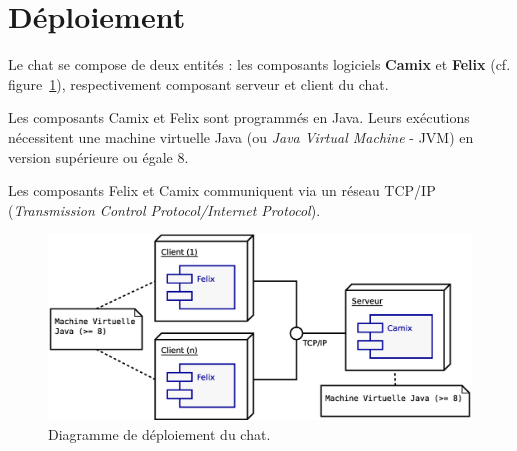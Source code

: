 %

\section{Déploiement}
\label{sec:deploiement}

Le chat se compose de deux entités : les composants logiciels \textbf{Camix} et \textbf{Felix} (cf. figure~\ref{sec:deploiement:figchat}), respectivement composant serveur et client du chat.

\smallskip
Les composants Camix et Felix sont programmés en Java. Leurs exécutions nécessitent une machine virtuelle Java (ou \textit{Java Virtual Machine} - JVM) en version supérieure ou égale 8.

\smallskip
Les composants Felix et Camix communiquent via un réseau TCP/IP (\textit{Transmission Control Protocol/Internet Protocol}).

\medskip
\begin{figure}[h!]
\begin{center}
\includegraphics[width=\linewidth]{../img/Chat_Deploiement.eps}
\caption{Diagramme de déploiement du chat.}
\label{sec:deploiement:figchat}
\end{center}
\end{figure}

